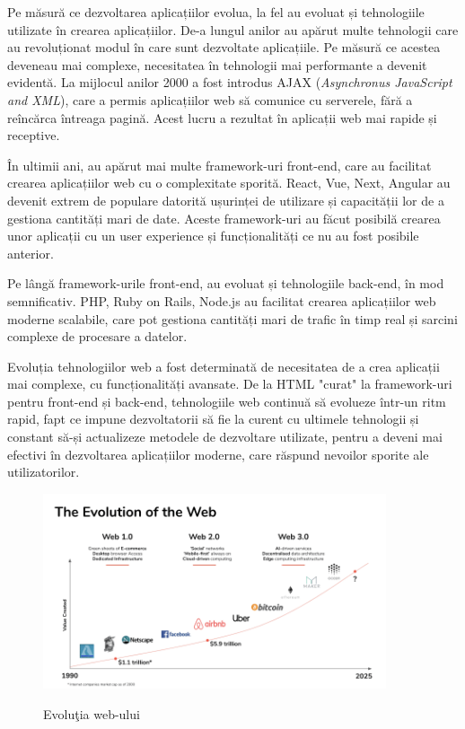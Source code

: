 \documentclass[12pt, a4paper]{report}
\begin{document}
Pe măsură ce dezvoltarea aplicațiilor evolua, la fel au evoluat și tehnologiile utilizate în crearea aplicațiilor. De-a lungul anilor au apărut multe tehnologii care au revoluționat modul în care sunt dezvoltate aplicațiile. Pe măsură ce acestea deveneau mai complexe, necesitatea în tehnologii mai performante a devenit evidentă. La mijlocul anilor 2000 a fost introdus AJAX (\emph{Asynchronus JavaScript and XML}), care a permis aplicațiilor web să comunice cu serverele, fără a reîncărca întreaga pagină. Acest lucru a rezultat în aplicații web mai rapide și receptive.

În ultimii ani, au apărut mai multe framework-uri front-end, care au facilitat crearea aplicațiilor web cu o complexitate sporită. React, Vue, Next, Angular au devenit extrem de populare datorită ușurinței de utilizare și capacității lor de a gestiona cantități mari de date. Aceste framework-uri au făcut posibilă crearea unor aplicații cu un user experience și funcționalități ce nu au fost posibile anterior.

Pe lângă framework-urile front-end, au evoluat și tehnologiile back-end, în mod semnificativ. PHP, Ruby on Rails, Node.js au facilitat crearea aplicațiilor web moderne scalabile, care pot gestiona cantități mari de trafic în timp real și sarcini complexe de procesare a datelor.

Evoluția tehnologiilor web a fost determinată de necesitatea de a crea aplicații mai complexe, cu funcționalități avansate. De la HTML "curat" la framework-uri pentru front-end și back-end, tehnologiile web continuă să evolueze într-un ritm rapid, fapt ce impune dezvoltatorii să fie la curent cu ultimele tehnologii și constant să-și actualizeze metodele de dezvoltare utilizate, pentru a deveni mai efectivi în dezvoltarea aplicațiilor moderne, care răspund nevoilor sporite ale utilizatorilor.

\begin{figure}[htbp]
	\centering
	\includegraphics[width=0.9\textwidth]{web-evolution.png} \label{fig:web-evolution}
	\caption{Evolu\c tia web-ului}
\end{figure}
\end{document}
